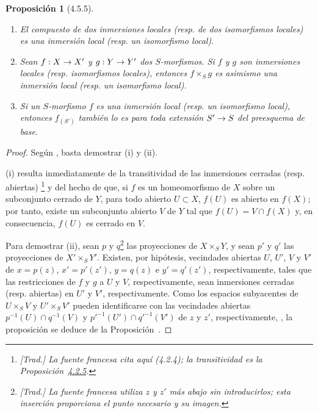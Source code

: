 \documentclass[oneside]{amsart}
\theoremstyle{ega-env-style}
\theoremstyle{ega-thm-env-style}
\newtheorem*{proposition}{Proposición}
\theoremstyle{ega-defn-env-style}
\renewcommand{\to}{\mathchoice{\longrightarrow}{\rightarrow}{\rightarrow}{\rightarrow}}
\let\EGAOriginalLabel\label
\renewcommand{\label}[1]{\phantomsection\EGAOriginalLabel{#1}}
\begin{document}
\begin{proposition}[4.5.5]
\label{I.4.5.5}
\medskip\noindent
\begin{enumerate}
  \item[{\rm(i)}] El compuesto de dos inmersiones locales (\textup{resp.} de dos isomorfismos locales) es una inmersión local (\textup{resp.} un isomorfismo local).
  \item[{\rm(ii)}] Sean $f:X\to X'$ y $g:Y\to Y'$ dos $S$-morfismos.
    Si $f$ y $g$ son inmersiones locales (\textup{resp.} isomorfismos locales), entonces $f\times_S g$ es asimismo una inmersión local (resp. un isomorfismo local).
  \item[{\rm(iii)}] Si un $S$-morfismo $f$ es una inmersión local (\textup{resp.} un isomorfismo local), entonces $f_{(S')}$ también lo es para toda extensión $S'\to S$ del preesquema de base.
\end{enumerate}
\end{proposition}

\begin{proof}
Según , basta demostrar (i) y (ii).

(i) resulta inmediatamente de la transitividad de las inmersiones cerradas (resp. abiertas) \footnote{\emph{[Trad.] La fuente francesa cita aquí (4.2.4); la transitividad es la Proposición~\hyperref[I.4.2.5]{4.2.5}.}} y del hecho de que, si $f$ es un homeomorfismo de $X$ sobre un subconjunto cerrado de $Y$, para todo abierto $U\subset X$, $f(U)$ es abierto en $f(X)$; por tanto, existe un subconjunto abierto $V$ de $Y$ tal que $f(U)=V\cap f(X)$ y, en consecuencia, $f(U)$ es cerrado en $V$.

Para demostrar (ii), sean $p$ y $q$\footnote{\emph{[Trad.] La fuente francesa utiliza $z$ y $z'$ más abajo sin introducirlos; esta inserción proporciona el punto necesario y su imagen.}} las proyecciones de $X\times_S Y$, y sean $p'$ y $q'$ las proyecciones de $X'\times_S Y'$.
Existen, por hipótesis, vecindades abiertas $U$, $U'$, $V$ y $V'$ de $x=p(z)$, $x'=p'(z')$, $y=q(z)$ e $y'=q'(z')$, respectivamente, tales que las restricciones de $f$ y $g$ a $U$ y $V$, respectivamente, sean inmersiones cerradas (resp. abiertas) en $U'$ y $V'$, respectivamente.
Como los espacios subyacentes de $U\times_S V$ y $U'\times_S V'$ pueden identificarse con las vecindades abiertas $p^{-1}(U)\cap q^{-1}(V)$ y ${p'}^{-1}(U')\cap{q'}^{-1}(V')$ de $z$ y $z'$, respectivamente, , la proposición se deduce de la Proposición~.
\end{proof}
\end{document}
